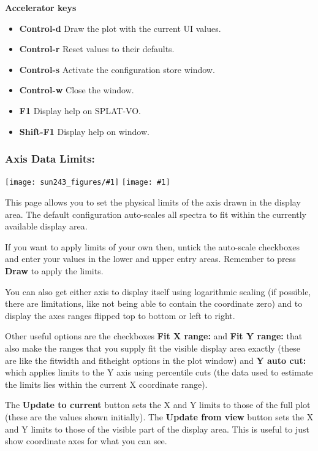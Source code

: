 \documentclass[twoside,11pt,nolof]{starlink}
\providecommand{\SPLAT}{\textsf{SPLAT-VO}}
\providecommand{\mainfigure}[1]
{\begin{center}
    \ifpdf
    \texttt{[image: sun243\_figures/\#1]}
    \else
    \texttt{[image: \#1]}
    \fi
 \end{center}
}
\newcommand{\labelitem}[1]{\textbf{#1}}
\providecommand{\subheading}[1]{\textbf{\large{#1}}}
\begin{document}
\subheading{Accelerator keys}

\begin{itemize}
\item \labelitem{Control-d} Draw the plot with the current UI values.
\item \labelitem{Control-r} Reset values to their defaults.
\item \labelitem{Control-s} Activate the configuration store window.
\item \labelitem{Control-w} Close the window.
\item \labelitem{F1} Display help on \SPLAT.
\item \labelitem{Shift-F1} Display help on window.
\end{itemize}


\newpage
\subsubsection*{Axis Data Limits:}

\mainfigure{configurewindowlimits}

This page allows you to set the physical limits of the axis drawn in the
display area. The default configuration auto-scales all spectra to fit
within the currently available display area.

If you want to apply limits of your own then, untick the auto-scale checkboxes
and enter your values in the lower and upper entry areas. Remember to press
\labelitem{Draw} to apply the limits.

You can also get either axis to display itself using logarithmic scaling (if
possible, there are limitations, like not being able to contain the coordinate
zero) and to display the axes ranges flipped top to bottom or left to right.

Other useful options are the checkboxes \labelitem{Fit X range:} and
\labelitem{Fit Y range:} that also make the ranges that you supply
fit the visible display area exactly (these are like the fitwidth and
fitheight options in the plot window) and \labelitem{Y auto cut:} which
applies limits to the Y axis using percentile cuts (the data used to estimate
the limits lies within the current X coordinate range).

The \labelitem{Update to current} button sets the X and Y limits to
those of the full plot (these are the values shown initially).
The \labelitem{Update from view} button sets the X and Y limits to
those of the visible part of the display area. This is useful to just
show coordinate axes for what you can see.
\end{document}

